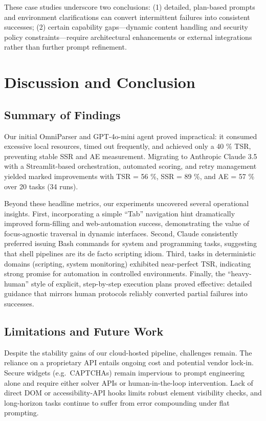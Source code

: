 \documentclass[runningheads]{llncs}
\begin{document}
These case studies underscore two conclusions: (1) detailed, plan-based prompts and environment clarifications can convert intermittent failures into consistent successes; (2) certain capability gaps—dynamic content handling and security policy constraints—require architectural enhancements or external integrations rather than further prompt refinement.  
\section{Discussion and Conclusion}

\subsection{Summary of Findings}
Our initial OmniParser and GPT-4o-mini agent proved impractical: it consumed excessive local resources, timed out frequently, and achieved only a 40 \% TSR, preventing stable SSR and AE measurement. Migrating to Anthropic Claude 3.5 with a Streamlit-based orchestration, automated scoring, and retry management yielded marked improvements with TSR = 56 \%, SSR = 89 \%, and AE = 57 \% over 20 tasks (34 runs).

Beyond these headline metrics, our experiments uncovered several operational insights. First, incorporating a simple “Tab” navigation hint dramatically improved form-filling and web-automation success, demonstrating the value of focus-agnostic traversal in dynamic interfaces. Second, Claude consistently preferred issuing Bash commands for system and programming tasks, suggesting that shell pipelines are its de facto scripting idiom. Third, tasks in deterministic domains (scripting, system monitoring) exhibited near-perfect TSR, indicating strong promise for automation in controlled environments. Finally, the “heavy-human” style of explicit, step-by-step execution plans proved effective: detailed guidance that mirrors human protocols reliably converted partial failures into successes.

\subsection{Limitations and Future Work}
Despite the stability gains of our cloud-hosted pipeline, challenges remain. The reliance on a proprietary API entails ongoing cost and potential vendor lock-in. Secure widgets (e.g.\ CAPTCHAs) remain impervious to prompt engineering alone and require either solver APIs or human-in-the-loop intervention. Lack of direct DOM or accessibility-API hooks limits robust element visibility checks, and long-horizon tasks continue to suffer from error compounding under flat prompting.
\end{document}
